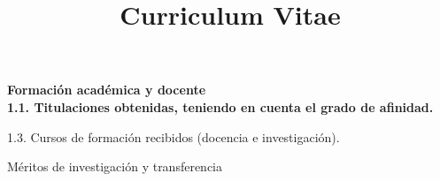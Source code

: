 \documentclass[a4paper,skipsamekey,11pt,english]{curve}
\title{Curriculum Vitae}
\begin{document}
 \makeheaders[c]
\textbf{
\large{Formación académica y docente\\}
1.1. Titulaciones obtenidas, teniendo en cuenta el grado de afinidad.}

1.3. Cursos de formación recibidos (docencia e investigación).


\large{Méritos de investigación y transferencia}




\end{document}
